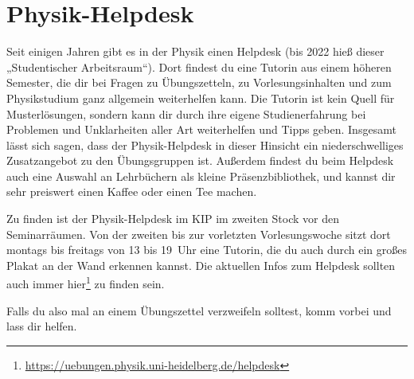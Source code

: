 \section{Physik-Helpdesk}
\label{sec:physik-helpdesk}

Seit einigen Jahren gibt es in der Physik einen Helpdesk (bis 2022 hieß dieser „Studentischer Arbeitsraum“). Dort findest du eine Tutorin aus einem höheren Semester, die dir bei Fragen zu Übungszetteln, zu Vorlesungsinhalten und zum Physikstudium ganz allgemein weiterhelfen kann. Die Tutorin ist kein Quell für Musterlösungen, sondern kann dir durch ihre eigene Studienerfahrung bei Problemen und Unklarheiten aller Art weiterhelfen und Tipps geben. Insgesamt lässt sich sagen, dass der Physik-Helpdesk in dieser Hinsicht ein niederschwelliges Zusatzangebot zu den Übungsgruppen ist. Außerdem findest du beim Helpdesk auch eine Auswahl an Lehrbüchern als kleine Präsenzbibliothek, und kannst dir sehr preiswert einen Kaffee oder einen Tee machen.

Zu finden ist der Physik-Helpdesk im \gls{KIP} im zweiten Stock vor den Seminarräumen. Von der zweiten bis zur vorletzten Vorlesungswoche sitzt dort montags bis freitags von 13 bis 19~Uhr eine Tutorin, die du auch durch ein großes Plakat an der Wand erkennen kannst. Die aktuellen Infos zum Helpdesk sollten auch immer hier\footnote{\url{https://uebungen.physik.uni-heidelberg.de/helpdesk}} zu finden sein.

Falls du also mal an einem Übungszettel verzweifeln solltest, komm vorbei und lass dir helfen.
